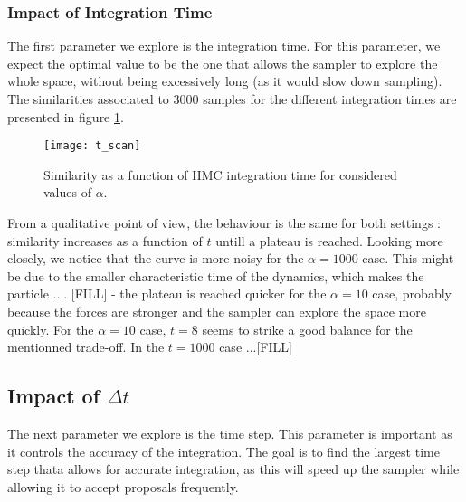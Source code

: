 \documentclass[a4paper, 12pt,oneside]{article}
\begin{document}
			\subsubsection{Impact of Integration Time}
			The first parameter we explore is the integration time. For this parameter, we expect the optimal value to be the one that allows the sampler to explore the whole space, without being excessively long (as it would slow down sampling).
			The similarities associated to 3000 samples for the different integration times are presented in figure \ref{fig:t-scan}.
			\begin{figure}[htb]
				\centering
					\vspace{0em}
					\texttt{[image: t\_scan]}
					\caption{Similarity as a function of HMC integration time for considered values of $\alpha$.}
					\label{fig:t-scan}
			\end{figure}
			From a qualitative point of view, the behaviour is the same for both settings : similarity increases as a function of $t$ untill a plateau is reached. Looking more closely, we notice that the curve is more noisy for the $\alpha=1000$ case. This might be due to the smaller characteristic time of the dynamics, which makes the particle .... [FILL]
			- the plateau is reached quicker for the $\alpha=10$ case, probably because the forces are stronger and the sampler can explore the space more quickly.
			For the $\alpha=10$ case, $t=8$ seems to strike a good balance for the mentionned trade-off. In the $t=1000$ case ...[FILL] 
			\subsection{Impact of $\Delta t$}
			The next parameter we explore is the time step. This parameter is important as it controls the accuracy of the integration. The goal is to find the largest time step thata allows for accurate integration, as this will speed up the sampler while allowing it to accept proposals frequently.
\end{document}
